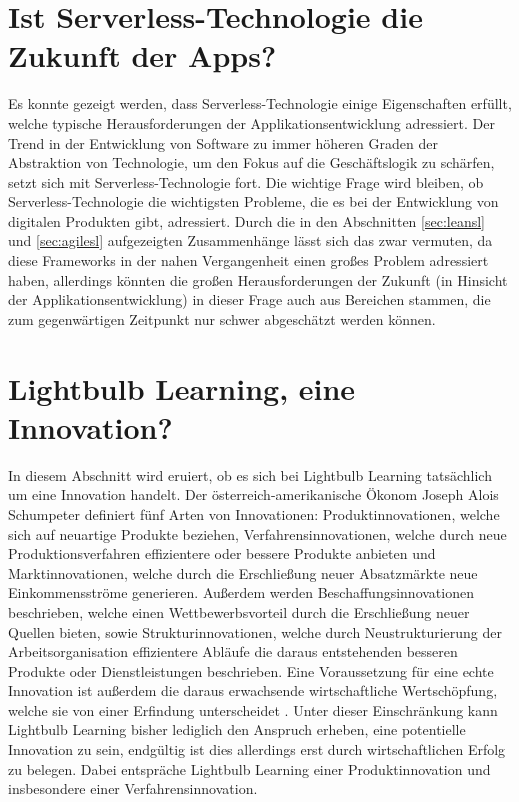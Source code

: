 \section{Ist Serverless-Technologie die Zukunft der Apps?}
Es konnte gezeigt werden, dass Serverless-Technologie einige Eigenschaften erfüllt, welche typische Herausforderungen der Applikationsentwicklung adressiert. Der Trend in der Entwicklung von Software zu immer höheren Graden der Abstraktion von Technologie, um den Fokus auf die Geschäftslogik zu schärfen, setzt sich mit Serverless-Technologie fort. Die wichtige Frage wird bleiben, ob Serverless-Technologie die wichtigsten Probleme, die es bei der Entwicklung von digitalen Produkten gibt, adressiert. Durch die in den Abschnitten \ref{sec:leansl} und \ref{sec:agilesl} aufgezeigten Zusammenhänge lässt sich das zwar vermuten, da diese Frameworks in der nahen Vergangenheit einen großes Problem adressiert haben, allerdings könnten die großen Herausforderungen der Zukunft (in Hinsicht der Applikationsentwicklung) in dieser Frage auch aus Bereichen stammen, die zum gegenwärtigen Zeitpunkt nur schwer abgeschätzt werden können.

\section{Lightbulb Learning, eine Innovation?}
In diesem Abschnitt wird eruiert, ob es sich bei Lightbulb Learning tatsächlich um eine Innovation handelt. Der österreich-amerikanische Ökonom Joseph Alois Schumpeter definiert fünf Arten von Innovationen: Produktinnovationen, welche sich auf neuartige Produkte beziehen, Verfahrensinnovationen, welche durch neue Produktionsverfahren effizientere oder bessere Produkte anbieten und Marktinnovationen, welche durch die Erschließung neuer Absatzmärkte neue Einkommensströme generieren. Außerdem werden Beschaffungsinnovationen beschrieben, welche einen Wettbewerbsvorteil durch die Erschließung neuer Quellen bieten, sowie Strukturinnovationen, welche durch Neustrukturierung der Arbeitsorganisation effizientere Abläufe die daraus entstehenden besseren Produkte oder Dienstleistungen beschrieben. Eine Voraussetzung für eine echte Innovation ist außerdem die daraus erwachsende wirtschaftliche Wertschöpfung, welche sie von einer Erfindung unterscheidet \cite[vgl.][]{Sledzik2013}. Unter dieser Einschränkung kann Lightbulb Learning bisher lediglich den Anspruch erheben, eine potentielle Innovation zu sein, endgültig ist dies allerdings erst durch wirtschaftlichen Erfolg zu belegen. Dabei entspräche Lightbulb Learning einer Produktinnovation und insbesondere einer Verfahrensinnovation.

